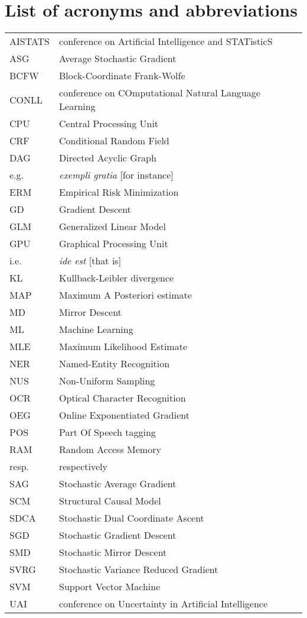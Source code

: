 \documentclass[12pt]{report} %
\numberwithin{equation}{chapter}
\numberwithin{table}{chapter}
\numberwithin{figure}{chapter}
\begin{document}
\chapter*{List of acronyms and abbreviations}
\begin{tabular}{lll}
  AISTATS & conference on Artificial Intelligence and STATisticS \\
  ASG & Average Stochastic Gradient \\
  BCFW & Block-Coordinate Frank-Wolfe \\
  CONLL & conference on COmputational Natural Language Learning \\
  CPU & Central Processing Unit \\
  CRF & Conditional Random Field \\
  DAG & Directed Acyclic Graph \\
  e.g. & \emph{exempli gratia} [for instance]\\
  ERM & Empirical Risk Minimization \\
  GD & Gradient Descent \\
  GLM & Generalized Linear Model \\
  GPU & Graphical Processing Unit \\
  i.e.& \emph{ide est} [that is]\\
  KL & Kullback-Leibler divergence \\
  MAP & Maximum A Posteriori estimate \\
  MD & Mirror Descent \\
  ML & Machine Learning \\
  MLE & Maximum Likelihood Estimate \\
  NER & Named-Entity Recognition \\
  NUS & Non-Uniform Sampling \\
  OCR & Optical Character Recognition \\
  OEG & Online Exponentiated Gradient \\
  POS & Part Of Speech tagging \\
  RAM & Random Access Memory \\
  resp. & respectively \\
  SAG & Stochastic Average Gradient \\
  SCM & Structural Causal Model \\
  SDCA & Stochastic Dual Coordinate Ascent \\
  SGD & Stochastic Gradient Descent \\  
  SMD & Stochastic Mirror Descent\\
  SVRG & Stochastic Variance Reduced Gradient \\
  SVM & Support Vector Machine\\
  UAI & conference on Uncertainty in Artificial Intelligence \\
\end{tabular}
\end{document}

